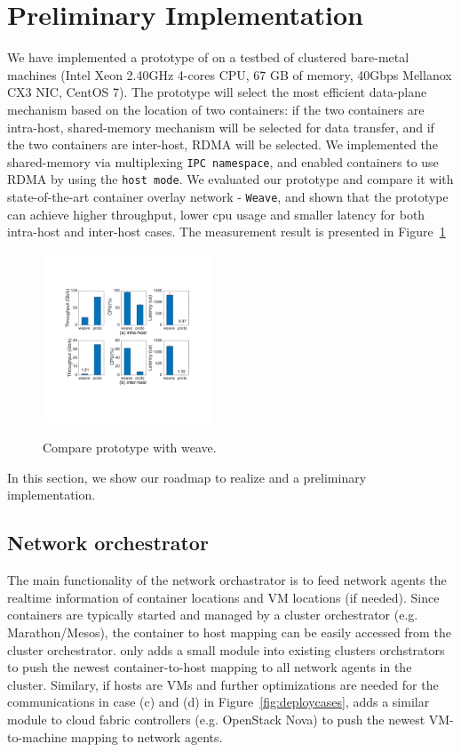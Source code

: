 \section{Preliminary Implementation} \label{sec:implementation}

We have implemented a prototype of \sysname on a testbed of clustered bare-metal
machines (Intel Xeon 2.40GHz 4-cores CPU, 67 GB of memory, 40Gbps Mellanox CX3
NIC, CentOS 7). The prototype will select the most
efficient data-plane mechanism based on the location of two containers: 
if the two containers are intra-host, shared-memory mechanism will be selected for data
transfer, and if the two containers are inter-host, RDMA will be selected.
We implemented the shared-memory via multiplexing \texttt{IPC namespace}, and enabled
containers to use RDMA by using the \texttt{host mode}.
We evaluated our prototype and compare it with state-of-the-art container overlay network
 - \texttt{Weave}, and shown that the prototype
can achieve higher throughput, lower cpu usage and smaller latency for both intra-host
and inter-host cases. The measurement result is presented in Figure~\ref{fig:sys_eval_proto}

     \begin{figure}[ht]
     \centering 
     \includegraphics[width=0.45\textwidth]{figures/system/eval_proto.pdf}
     \label{fig:sys_eval_proto}
     \caption{Compare \sysname prototype with weave.} 
     \end{figure}


\iffalse

In this section, we show our roadmap to realize \sysname and a preliminary 
implementation.

\subsection{Network orchestrator}

The main functionality of the network orchastrator is to feed network agents
the realtime information of container locations and VM locations (if needed).
Since containers are typically started and managed by a cluster orchestrator
(e.g. Marathon/Mesos), the container to host mapping can be easily accessed
from the cluster orchestrator. \sysname only adds a small module into 
existing clusters orchstrators to push the newest container-to-host mapping
to all network agents in the cluster. Similary, if hosts are VMs and further optimizations are needed for the communications in case (c) and (d) in 
Figure~\ref{fig:deploycases}, \sysname adds a similar module to cloud fabric
controllers (e.g. OpenStack Nova) to push the newest VM-to-machine mapping
to network agents.

